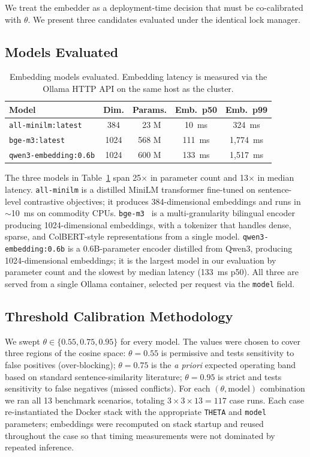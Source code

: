 \documentclass[sigconf]{acmart}
\begin{document}
We treat the embedder as a deployment-time decision that must be
co-calibrated with $\theta$. We present three candidates evaluated under
the identical lock manager.

\subsection{Models Evaluated}
\label{sec:emb-models}

\begin{table}[t]
  \centering
  \caption{Embedding models evaluated. Embedding latency is measured
    via the Ollama HTTP API on the same host as the cluster.}
  \label{tab:models}
  \small
  \begin{tabular}{lcccc}
    \toprule
    Model & Dim. & Params. & Emb.\ p50 & Emb.\ p99 \\
    \midrule
    \texttt{all-minilm:latest}      & 384  & ~23 M  & 10~ms  & 324~ms  \\
    \texttt{bge-m3:latest}          & 1024 & 568 M  & 111~ms & 1{,}774~ms \\
    \texttt{qwen3-embedding:0.6b}   & 1024 & 600 M  & 133~ms & 1{,}517~ms \\
    \bottomrule
  \end{tabular}
\end{table}

The three models in Table~\ref{tab:models} span 25$\times$ in parameter
count and 13$\times$ in median latency. \texttt{all-minilm} is a
distilled MiniLM transformer fine-tuned on sentence-level
contrastive objectives; it produces 384-dimensional embeddings and
runs in $\sim$10~ms on commodity CPUs. \texttt{bge-m3}~\cite{bge} is a
multi-granularity bilingual encoder producing 1024-dimensional
embeddings, with a tokenizer that handles dense, sparse, and ColBERT-style
representations from a single model. \texttt{qwen3-embedding:0.6b}
\cite{qwen3} is a 0.6B-parameter encoder distilled from Qwen3,
producing 1024-dimensional embeddings; it is the largest model in our
evaluation by parameter count and the slowest by median latency
(133~ms p50). All three are served from a single Ollama container,
selected per request via the \texttt{model} field.

\subsection{Threshold Calibration Methodology}
\label{sec:emb-theta}

We swept $\theta\in\{0.55, 0.75, 0.95\}$ for every model. The values
were chosen to cover three regions of the cosine space:
$\theta=0.55$ is permissive and tests sensitivity to false positives
(over-blocking); $\theta=0.75$ is the \emph{a priori} expected
operating band based on standard sentence-similarity literature;
$\theta=0.95$ is strict and tests sensitivity to false negatives
(missed conflicts). For each $(\theta,\text{model})$ combination we ran
all 13 benchmark scenarios, totaling $3\times3\times13=117$ case runs.
Each case re-instantiated the Docker stack with the appropriate
\texttt{THETA} and \texttt{model} parameters; embeddings were recomputed
on stack startup and reused throughout the case so that timing
measurements were not dominated by repeated inference.
\end{document}
